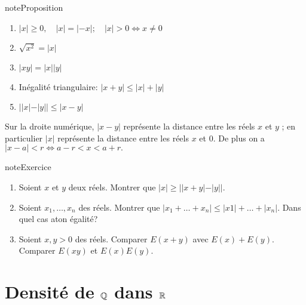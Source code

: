 \documentclass[letterpaper,10pt,french]{jupyterBook}
\begin{document}
\begin{sphinxadmonition}{note}{Proposition}
\begin{enumerate}
%
\item {} 
\sphinxAtStartPar
\(|x|\geq0,\quad |x|=|-x|;\quad |x|>0\Leftrightarrow x\neq0\)

\item {} 
\sphinxAtStartPar
\(\sqrt{x^2}=|x|\)

\item {} 
\sphinxAtStartPar
\(|xy|=|x||y|\)

\item {} 
\sphinxAtStartPar
Inégalité triangulaire: \(|x+y|\leq |x|+|y|\)

\item {} 
\sphinxAtStartPar
\(||x|-|y||\leq |x-y|\)

\end{enumerate}
\end{sphinxadmonition}

\sphinxAtStartPar
Sur la droite numérique, \(|x-y|\) représente la distance entre les réels \(x\) et \(y\) ; en particulier \(|x|\) représente la distance
entre les réels \(x\) et 0. De plus on a \(|x-a|<r\Leftrightarrow a-r<x<a+r.\)

\begin{sphinxadmonition}{note}{Exercice}
\begin{enumerate}
%
\item {} 
\sphinxAtStartPar
Soient \(x\) et \(y\) deux réels. Montrer que \(|x|\geq ||x+y|-|y||.\)

\item {} 
\sphinxAtStartPar
Soient \(x_1,\ldots,x_n\) des réels. Montrer que \(|x_1 +\ldots+ x_n
|\leq|x1
| + \ldots + |x_n
|\). Dans quel cas a\sphinxhyphen{}t\sphinxhyphen{}on égalité?

\item {} 
\sphinxAtStartPar
Soient \(x, y > 0\) des réels. Comparer \(E(x + y)\) avec \(E(x)+E( y).\) Comparer \(E(xy)\) et \(E(x)E(y).\)

\end{enumerate}
\end{sphinxadmonition}


\section{Densité de \protect\(\mathbb{Q}\protect\) dans \protect\(\mathbb{R}\protect\)}
\label{\detokenize{proprties:densite-de-mathbb-q-dans-mathbb-r}}
\end{document}
